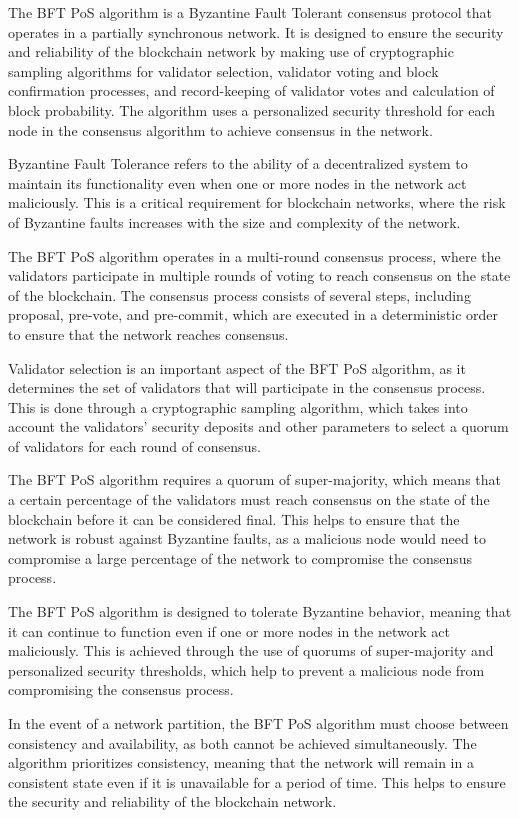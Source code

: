 The BFT PoS algorithm is a Byzantine Fault Tolerant consensus protocol that operates in a partially synchronous network. It is designed to ensure the security and reliability of the blockchain network by making use of cryptographic sampling algorithms for validator selection, validator voting and block confirmation processes, and record-keeping of validator votes and calculation of block probability. The algorithm uses a personalized security threshold for each node in the consensus algorithm to achieve consensus in the network.

Byzantine Fault Tolerance \cite{lamport2019byzantine} refers to the ability of a decentralized system to maintain its functionality even when one or more nodes in the network act maliciously. This is a critical requirement for blockchain networks, where the risk of Byzantine faults increases with the size and complexity of the network.

The BFT PoS algorithm operates in a multi-round consensus process, where the validators participate in multiple rounds of voting to reach consensus on the state of the blockchain. The consensus process consists of several steps, including proposal, pre-vote, and pre-commit, which are executed in a deterministic order to ensure that the network reaches consensus.

Validator selection is an important aspect of the BFT PoS algorithm, as it determines the set of validators that will participate in the consensus process. This is done through a cryptographic sampling algorithm, which takes into account the validators' security deposits and other parameters to select a quorum of validators for each round of consensus.

The BFT PoS algorithm requires a quorum of super-majority, which means that a certain percentage of the validators must reach consensus on the state of the blockchain before it can be considered final. This helps to ensure that the network is robust against Byzantine faults, as a malicious node would need to compromise a large percentage of the network to compromise the consensus process.

The BFT PoS algorithm is designed to tolerate Byzantine behavior, meaning that it can continue to function even if one or more nodes in the network act maliciously. This is achieved through the use of quorums of super-majority and personalized security thresholds, which help to prevent a malicious node from compromising the consensus process.

In the event of a network partition, the BFT PoS algorithm must choose between consistency and availability, as both cannot be achieved simultaneously. The algorithm prioritizes consistency, meaning that the network will remain in a consistent state even if it is unavailable for a period of time. This helps to ensure the security and reliability of the blockchain network.

